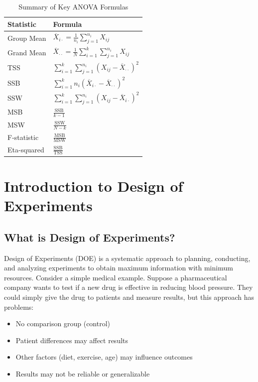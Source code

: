 \documentclass[twoside]{book}
\begin{document}
\begin{table}[h]
\centering
\caption{Summary of Key ANOVA Formulas}
\begin{tabular}{|l|l|}
\hline
\textbf{Statistic} & \textbf{Formula} \\
\hline
Group Mean & $\overline{X}_{i\cdot} = \frac{1}{n_i} \sum_{j=1}^{n_i} X_{ij}$ \\
\hline
Grand Mean & $\overline{X}_{\cdot\cdot} = \frac{1}{N} \sum_{i=1}^k \sum_{j=1}^{n_i} X_{ij}$ \\
\hline
TSS & $\sum_{i=1}^k \sum_{j=1}^{n_i} (X_{ij} - \overline{X}_{\cdot\cdot})^2$ \\
\hline
SSB & $\sum_{i=1}^k n_i (\overline{X}_{i\cdot} - \overline{X}_{\cdot\cdot})^2$ \\
\hline
SSW & $\sum_{i=1}^k \sum_{j=1}^{n_i} (X_{ij} - \overline{X}_{i\cdot})^2$ \\
\hline
MSB & $\frac{\text{SSB}}{k-1}$ \\
\hline
MSW & $\frac{\text{SSW}}{N-k}$ \\
\hline
F-statistic & $\frac{\text{MSB}}{\text{MSW}}$ \\
\hline
Eta-squared & $\frac{\text{SSB}}{\text{TSS}}$ \\
\hline
\end{tabular}
\end{table}


\chapter{Introduction to Design of Experiments}

\section{What is Design of Experiments?}

Design of Experiments (DOE) is a systematic approach to planning, conducting, and analyzing experiments to obtain maximum information with minimum resources. Consider a simple medical example. Suppose a pharmaceutical company wants to test if a new drug is effective in reducing blood pressure. They could simply give the drug to patients and measure results, but this approach has problems:
\begin{itemize}
    \item No comparison group (control)
    \item Patient differences may affect results
    \item Other factors (diet, exercise, age) may influence outcomes
    \item Results may not be reliable or generalizable
\end{itemize}
\end{document}
